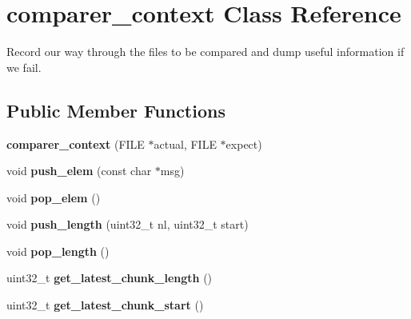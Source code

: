 \hypertarget{classcomparer__context}{\section{comparer\+\_\+context Class Reference}
\label{classcomparer__context}
}


Record our way through the files to be compared and dump useful information if we fail.  


\subsection*{Public Member Functions}
\begin{DoxyCompactItemize}
\item 
\hypertarget{classcomparer__context_a068c827574eb8b5130662d1654c1a6bc}{{\bfseries comparer\+\_\+context} (F\+I\+L\+E $\ast$actual, F\+I\+L\+E $\ast$expect)}\label{classcomparer__context_a068c827574eb8b5130662d1654c1a6bc}

\item 
\hypertarget{classcomparer__context_ad36507f497594d8e2e97db55df17954f}{void {\bfseries push\+\_\+elem} (const char $\ast$msg)}\label{classcomparer__context_ad36507f497594d8e2e97db55df17954f}

\item 
\hypertarget{classcomparer__context_a2058c5e9d25b40724c448524e963fa7e}{void {\bfseries pop\+\_\+elem} ()}\label{classcomparer__context_a2058c5e9d25b40724c448524e963fa7e}

\item 
\hypertarget{classcomparer__context_a3afcc2f600b39dd297d99c366c77c6d9}{void {\bfseries push\+\_\+length} (uint32\+\_\+t nl, uint32\+\_\+t start)}\label{classcomparer__context_a3afcc2f600b39dd297d99c366c77c6d9}

\item 
\hypertarget{classcomparer__context_ad14e75fe245cea084a58e2a96b96e395}{void {\bfseries pop\+\_\+length} ()}\label{classcomparer__context_ad14e75fe245cea084a58e2a96b96e395}

\item 
\hypertarget{classcomparer__context_a730168b3ce4e19565938da2dc78e8832}{uint32\+\_\+t {\bfseries get\+\_\+latest\+\_\+chunk\+\_\+length} ()}\label{classcomparer__context_a730168b3ce4e19565938da2dc78e8832}

\item 
\hypertarget{classcomparer__context_a15343b289cf3eab7f89478b9ebe8e304}{uint32\+\_\+t {\bfseries get\+\_\+latest\+\_\+chunk\+\_\+start} ()}\label{classcomparer__context_a15343b289cf3eab7f89478b9ebe8e304}


\end{DoxyCompactItemize}
